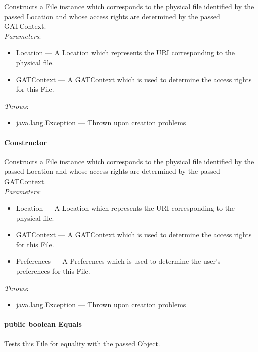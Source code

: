 \documentclass[$Date: 2003/06/26 19:29:31 $]{glabarticle}
\begin{document}
Constructs a File instance which corresponds to the physical file
identified by the passed Location and whose access rights are
determined by the passed GATContext. \\

\textit{Parameters}:
\begin{itemize}
\item[] Location --- A Location which represents the URI corresponding to the physical file.
\item[] GATContext --- A GATContext which is used to determine the access rights for this File.
\end{itemize}

 \textit{Throws}:
 \begin{itemize}
 \item[] java.lang.Exception --- Thrown upon creation problems 
 \end{itemize}

\paragraph{Constructor}

Constructs a File instance which corresponds to the physical file
identified by the passed Location and whose access rights are
determined by the passed GATContext. \\

\textit{Parameters}:
\begin{itemize}
\item[] Location --- A Location which represents the URI corresponding to the physical file.
\item[] GATContext --- A GATContext which is used to determine the access rights for this File.
\item[] Preferences --- A Preferences which is used to determine the user's preferences for this File.
\end{itemize}

\textit{Throws}:
\begin{itemize}
\item[] java.lang.Exception --- Thrown upon creation problems 
\end{itemize}

\paragraph{public boolean Equals}

Tests this File for equality with the passed Object.
\end{document}

